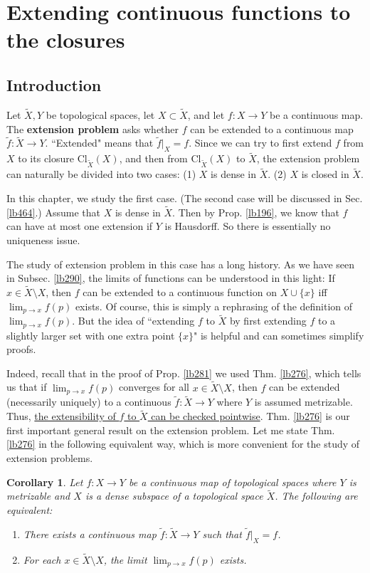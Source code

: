 \documentclass[12pt,b5paper,notitlepage]{article}
\theoremstyle{definition}
\theoremstyle{plain}
\newtheorem{co}[df]{Corollary}
\newcommand{\wtd}{\widetilde}
\newcommand{\Cl}{\mathrm{Cl}}
\numberwithin{equation}{section}
\begin{document}
\newpage


\section{Extending continuous functions to the closures}



\subsection{Introduction}

Let $\wtd X,Y$ be topological spaces, let $X\subset \wtd X$, and let $f:X\rightarrow Y$ be a continuous map. The \textbf{extension problem} asks whether $f$ can be extended to a continuous map $\wtd f:\wtd X\rightarrow Y$. ``Extended" means that $\wtd f|_X=f$.  Since we can try to first extend $f$ from $X$ to its closure $\Cl_{\wtd X}(X)$, and then from $\Cl_{\wtd X}(X)$ to $\wtd X$, the extension problem can naturally be divided into two cases: (1) $X$ is dense in $\wtd X$. (2) $X$ is closed in $\wtd X$.

In this chapter, we study the first case. (The second case will be discussed in Sec. \ref{lb464}.) Assume that $X$ is dense in $\wtd X$. Then by Prop. \ref{lb196}, we know that $f$ can have at most one extension if $Y$ is Hausdorff. So there is essentially no uniqueness issue. 


The study of extension problem in this case has a long history. As we have seen in Subsec. \ref{lb290}, the limits of functions can be understood in this light: If $x\in\wtd X\setminus X$, then $f$ can be extended to a continuous function on $X\cup\{x\}$ iff $\lim_{p\rightarrow x}f(p)$ exists. Of course, this is simply a rephrasing of the definition of $\lim_{p\rightarrow x}f(p)$. But the idea of ``extending $f$ to $\wtd X$ by first extending $f$ to a slightly larger set with one extra point $\{x\}$" is helpful and can sometimes simplify proofs.

Indeed, recall that in the proof of Prop. \ref{lb281} we used Thm. \ref{lb276}, which tells us that if $\lim_{p\rightarrow x}f(p)$ converges for all $x\in\wtd X\setminus X$, then $f$ can be extended (necessarily uniquely) to a continuous $\wtd f:\wtd X\rightarrow Y$ where $Y$ is assumed metrizable. Thus, \uline{the extensibility of $f$ to $\wtd X$ can be checked pointwise}. Thm. \ref{lb276} is our first important general result on the extension problem. Let me state Thm. \ref{lb276} in the following equivalent way, which is more convenient for the  study of extension problems.
\begin{co}\label{lb307}
Let $f:X\rightarrow Y$ be a continuous map of topological spaces where $Y$ is metrizable and $X$ is a dense subspace of a topological space $\wtd X$. The following are equivalent:
\begin{enumerate}[label=(\arabic*)]
\item There exists a continuous map $\wtd f:\wtd X\rightarrow Y$ such that $\wtd f|_X= f$.
\item For each $x\in\wtd X\setminus X$, the limit $\lim_{p\rightarrow x}f(p)$ exists.
\end{enumerate}
\end{co}
\end{document}
